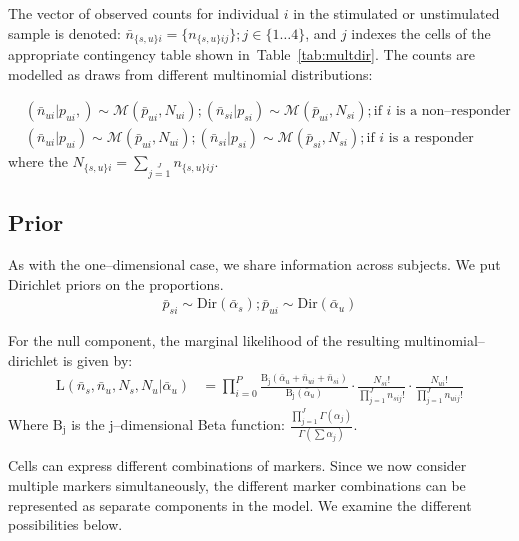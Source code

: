 \documentclass[11pt]{article}
\begin{document}
The vector of observed counts for individual $i$ in the stimulated or unstimulated sample is denoted: $\bar{n}_{\{s,u\}i} = \{n_{\{s,u\}ij}\} ; j\in\{1\ldots 4\}$, and $j$ indexes the cells of the appropriate contingency table shown in~Table~\ref{tab:multdir}. The counts are modelled as draws from different multinomial distributions:

\begin{align}
 &(\bar{n}_{ui}|p_{ui},) \sim \mathcal{M}(\bar{p}_{ui},N_{ui}); (\bar{n}_{si}|p_{si}) \sim \mathcal{M}(\bar{p}_{ui},N_{si}); \text{if $i$ is a non--responder}\\
 &(\bar{n}_{ui}|p_{ui}) \sim \mathcal{M}(\bar{p}_{ui},N_{ui}); (\bar{n}_{si}|p_{si}) \sim \mathcal{M}(\bar{p}_{si},N_{si});\text{if $i$ is a responder}
\end{align}
where the $N_{\{s,u\}i}=\sum\limits_{j=1}\limits^{J} n_{\{s,u\}ij}$.
\subsection{Prior}
As with the one--dimensional case, we share information across subjects. We put Dirichlet priors on the proportions.
\begin{align}
\bar{p}_{si} \sim \mathrm{Dir}(\bar{\alpha}_s) ; \bar{p}_{ui} \sim \mathrm{Dir}(\bar{\alpha}_u)
\end{align}

For the null component, the marginal likelihood of the resulting multinomial--dirichlet is given by: 
\begin{align}
\mathrm{L}(\bar{n}_s,\bar{n}_u,N_s,N_u|\bar{\alpha}_u) &= \prod_{i=0}^P\frac{ \mathrm{B_j}(\bar{\alpha}_{u}+\bar{n}_{ui}+\bar{n}_{si})}{\mathrm{B_j}(\bar{\alpha}_u)} \cdot \frac{N_{si}!}{\prod_{j=1}^J n_{sij}!} \cdot \frac{N_{ui}!}{\prod_{j=1}^J n_{uij}!}\label{NRmd}
\end{align}
Where $\mathrm{B_j}$ is the $\mathrm{j}$--dimensional Beta function: $\frac{\prod_{j=1}^J\Gamma(\alpha_j)}{\Gamma(\sum\alpha_j)}$.

Cells can express different combinations of markers. Since we now consider multiple markers simultaneously, the different marker combinations can be represented as separate components in the model. We examine the different possibilities below.
\end{document}
